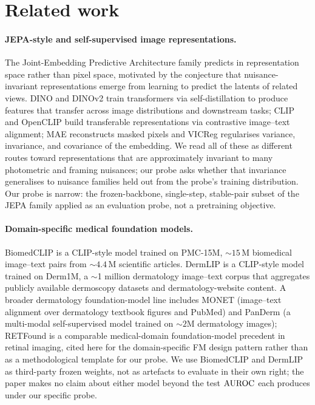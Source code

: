 \section{Related work}
\label{sec:related-work}

\paragraph{JEPA-style and self-supervised image representations.}
The Joint-Embedding Predictive Architecture family
\citep{lecun2022path, assran2023ijepa} predicts in representation space rather
than pixel space, motivated by the conjecture that nuisance-invariant
representations emerge from learning to predict the latents of related views.
DINO \citep{caron2021dino} and DINOv2 \citep{oquab2024dinov2} train
transformers via self-distillation to produce features that transfer
across image distributions and downstream tasks; CLIP
\citep{radford2021clip} and OpenCLIP \citep{cherti2023openclip} build
transferable representations via contrastive image--text alignment;
MAE \citep{he2022mae} reconstructs masked pixels and VICReg
\citep{bardes2022vicreg} regularises variance, invariance, and
covariance of the embedding. We read all of these as different routes
toward representations that are approximately invariant to many
photometric and framing nuisances; our probe asks whether that
invariance generalises to nuisance families held out from the probe's
training distribution. Our probe is
narrow: the frozen-backbone, single-step, stable-pair subset of the JEPA family
applied as an evaluation probe, not a pretraining objective.

\paragraph{Domain-specific medical foundation models.}
BiomedCLIP \citep{zhang2023biomedclip} is a CLIP-style model trained on
PMC-15M, $\sim$$15$\,M biomedical image--text pairs from $\sim$$4.4$\,M
scientific articles. DermLIP \citep{yan2025derm1m} is a CLIP-style model trained on
Derm1M, a $\sim$1 million dermatology image--text corpus that aggregates
publicly available dermoscopy datasets and dermatology-website content.
A broader dermatology foundation-model line includes MONET
\citep{kim2024monet} (image--text alignment over dermatology textbook
figures and PubMed) and PanDerm \citep{yan2024panderm} (a multi-modal
self-supervised model trained on $\sim$$2$M dermatology images);
RETFound \citep{zhou2023retfound} is a comparable medical-domain
foundation-model precedent in retinal imaging, cited here for the
domain-specific FM design pattern rather than as a methodological
template for our probe. We use BiomedCLIP and DermLIP as third-party frozen weights,
not as artefacts to evaluate in their own right; the paper makes no
claim about either model beyond the test $\mathrm{AUROC}$ each produces under
our specific probe.

